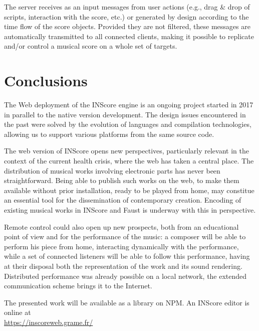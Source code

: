 \documentclass{article}
\begin{document}
The server receives as an input messages from user actions (e.g., drag \& drop of scripts, interaction with the score, etc.) or generated by design according to the time flow of the score objects. Provided they are not filtered, these messages are automatically transmitted to all connected clients, making it possible to replicate and/or control a musical score on a whole set of targets.


\section{Conclusions}

The Web deployment of the INScore engine is an ongoing project started in 2017 in parallel to the native version development. The design issues encountered in the past were solved by the evolution of languages and compilation technologies, allowing us to support various platforms from the same source code.

The web version of INScore opens new perspectives, particularly relevant in the context of the current health crisis, where the web has taken a central place. 
The distribution of musical works involving electronic parts has never been straightforward. Being able to publish such works on the web, to make them available without prior installation, ready to be played from home, may constitue an essential tool for the dissemination of contemporary creation. Encoding of existing musical works in INScore and Faust is underway with this in perspective.

Remote control could also open up new prospects, both from an educational point of view and for the performance of the music: a composer will be able to perform his piece from home, interacting dynamically with the performance, while a set of connected listeners will be able to follow this performance, having at their disposal both the representation of the work and its sound rendering. Distributed performance was already possible on a local network, the extended communication scheme brings it to the Internet.

The presented work will be available as a library on NPM. An INScore editor is online at \\
\hspace*{15mm} {\small \url{https://inscoreweb.grame.fr/}}



\balance

\end{document}
